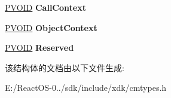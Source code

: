 \begin{DoxyCompactItemize}
\hyperlink{interfacevoid}{P\+V\+O\+ID} {\bfseries Call\+Context}
\item 
\mbox{\label{struct___r_e_g___q_u_e_r_y___m_u_l_t_i_p_l_e___v_a_l_u_e___k_e_y___i_n_f_o_r_m_a_t_i_o_n_ac13c7198d3cb57ad002730a43f763bdf}} 
\hyperlink{interfacevoid}{P\+V\+O\+ID} {\bfseries Object\+Context}
\item 
\mbox{\label{struct___r_e_g___q_u_e_r_y___m_u_l_t_i_p_l_e___v_a_l_u_e___k_e_y___i_n_f_o_r_m_a_t_i_o_n_aec5572c285738f73a7dcf49463b09bc9}} 
\hyperlink{interfacevoid}{P\+V\+O\+ID} {\bfseries Reserved}
\end{DoxyCompactItemize}


该结构体的文档由以下文件生成\+:\begin{DoxyCompactItemize}
\item 
E\+:/\+React\+O\+S-\/0../sdk/include/xdk/cmtypes.\+h\end{DoxyCompactItemize}
